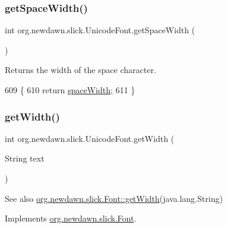 \subsubsection{\texorpdfstring{get\+Space\+Width()}{getSpaceWidth()}}
{\footnotesize\ttfamily int org.\+newdawn.\+slick.\+Unicode\+Font.\+get\+Space\+Width (\begin{DoxyParamCaption}{ }\end{DoxyParamCaption})\hspace{0.3cm}{\ttfamily [inline]}}

Returns the width of the space character. 
\begin{DoxyCode}
609                                 \{
610         \textcolor{keywordflow}{return} \mbox{\hyperlink{classorg_1_1newdawn_1_1slick_1_1_unicode_font_a0a5c4d3ca783d30c87d5434c1c50b8f3}{spaceWidth}};
611     \}
\end{DoxyCode}
\mbox{\label{classorg_1_1newdawn_1_1slick_1_1_unicode_font_a5a1aa518193d31f1407d3cb5e5997ca8}} 
\subsubsection{\texorpdfstring{get\+Width()}{getWidth()}}
{\footnotesize\ttfamily int org.\+newdawn.\+slick.\+Unicode\+Font.\+get\+Width (\begin{DoxyParamCaption}\item[{String}]{text }\end{DoxyParamCaption})\hspace{0.3cm}{\ttfamily [inline]}}

\begin{DoxySeeAlso}{See also}
\mbox{\hyperlink{interfaceorg_1_1newdawn_1_1slick_1_1_font_a6dbdd5828730e18fcf0612307d0394b1}{org.\+newdawn.\+slick.\+Font\+::get\+Width}}(java.\+lang.\+String) 
\end{DoxySeeAlso}


Implements \mbox{\hyperlink{interfaceorg_1_1newdawn_1_1slick_1_1_font_a6dbdd5828730e18fcf0612307d0394b1}{org.\+newdawn.\+slick.\+Font}}.


